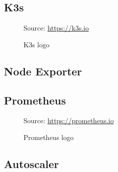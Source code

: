\subsection{K3s}
\label{subsec:implementation_dependencies_k3s}

\begin{figure} %
  \centering
  \def\stackalignment{r} %
  {\scriptsize \parbox[t]{\linewidth}{ Source: \url{https://k3s.io}} }
  \caption{K3s logo}
\end{figure}

\subsection{Node Exporter}
\label{subsec:implementation_dependencies_node_exporter}

\subsection{Prometheus}
\label{subsec:implementation_dependencies_prometheus}

\begin{figure} %
  \centering
  \def\stackalignment{r} %
  {\scriptsize \parbox[t]{\linewidth}{ Source: \url{https://prometheus.io}} }
  \caption{Prometheus logo}
\end{figure}

\subsection{Autoscaler}
\label{subsec:implementation_dependencies_autoscaler}

